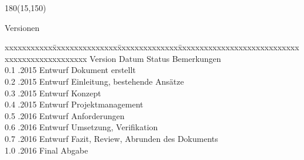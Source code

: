 
\begin{textblock}{180}(15,150)
\color{black}
\begin{huge}
Versionen
\end{huge}


\vspace{10mm}

\fontsize{10pt}{18pt}\selectfont
\begin{tabbing}
xxxxxxxxxxx\=xxxxxxxxxxxxxxx\=xxxxxxxxxxxxxx\=xxxxxxxxxxxxxxxxxxxxxxxxxxxxxxxxxxxxxxxxxxxxxxx \kill
Version	\> Datum	\> Status		\> Bemerkungen		\\
0.1	.2015	\> Entwurf		\> Dokument erstellt	\\	
0.2	.2015	\> Entwurf		\> Einleitung, bestehende Ansätze \\	
0.3	.2015	\> Entwurf		\> Konzept\\	
0.4	.2015	\> Entwurf		\> Projektmanagement	\\	
0.5	.2016	\> Entwurf		\> Anforderungen \\	
0.6	.2016	\> Entwurf		\> Umsetzung, Verifikation\\
0.7	.2016	\> Entwurf		\> Fazit, Review, Abrunden des Dokuments\\
1.0	.2016	\> Final		    \> Abgabe\\
\end{tabbing}

\end{textblock}


